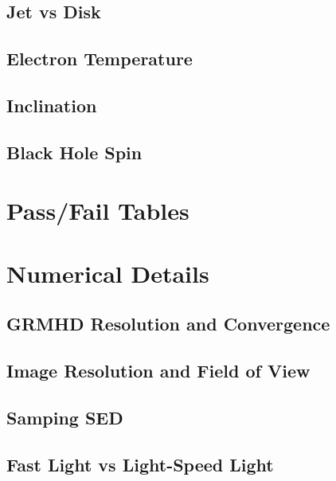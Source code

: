 \documentclass[twocolumn,twocolappendix,tighten,dvipsnames,linenumbers]{aastex63}
\begin{document}
\subsection{Jet vs Disk}

\subsection{Electron Temperature}

\subsection{Inclination}

\subsection{Black Hole Spin}

\software{\ehtim, \difmap, \smili, \dmc, \themis, \foci}

\appendix

\section{Pass/Fail Tables}

\section{Numerical Details}

\subsection{GRMHD Resolution and Convergence}

\subsection{Image Resolution and Field of View}

\subsection{Samping SED}

\subsection{Fast Light vs Light-Speed Light}




\end{document}
